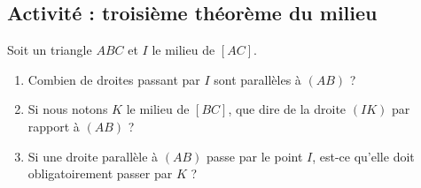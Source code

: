 
\subsection*{Activité : troisième théorème du milieu}

Soit un triangle \( ABC\) et \( I\) le milieu de \( [AC]\).
\begin{enumerate}
    \item
        Combien de droites passant par \( I\) sont parallèles à \( (AB)\) ?
    \item
        Si nous notons \( K\) le milieu de \( [BC]\), que dire de la droite \( (IK)\) par rapport à \( (AB)\) ?
    \item
        Si une droite parallèle à \( (AB)\) passe par le point \( I\), est-ce qu'elle doit obligatoirement passer par \( K\) ?
\end{enumerate}
